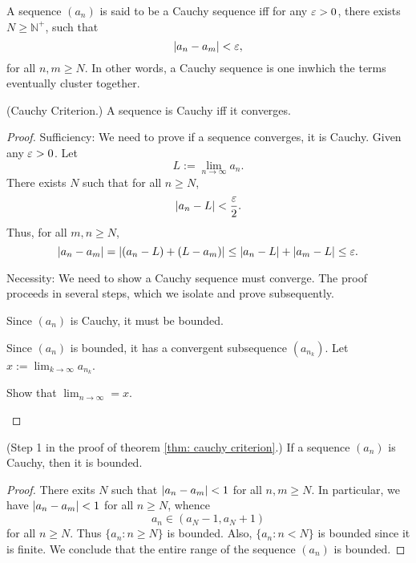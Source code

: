 \documentclass[10pt]{article}
\begin{document}
	\begin{definition}
		A sequence $(a_n)$ is said to be a Cauchy sequence iff for any $\varepsilon >0$, there exists $N \ge \mathbb{N}^+$, such that
		\begin{equation}
			\abs{a_n - a_m} < \varepsilon,
		\end{equation}
		for all $n,m \ge N$. In other words, a Cauchy sequence is one inwhich the terms eventually cluster together.
	\end{definition}
	\begin{theorem}\label{thm: cauchy criterion}
		(Cauchy Criterion.) A sequence is Cauchy iff it converges.
	\end{theorem}
	\begin{proof}
		Sufficiency: We need to prove if a sequence converges, it is Cauchy. Given any $\varepsilon > 0$. Let
		\begin{equation}
			L := \lim_{n \to \infty} a_n.
		\end{equation}
		There exists $N$ such that for all $n \ge N$,
		\begin{equation}
			\abs{a_n - L} < \frac{\varepsilon}{2}.
		\end{equation}
		Thus, for all $m,n \ge N$,
		\begin{equation}
			\abs{a_n - a_m} = \abs{(a_n - L) + (L - a_m)} \le \abs{a_n - L} + \abs{a_m - L} \le \varepsilon.
		\end{equation}

		Necessity: We need to show a Cauchy sequence must converge. The proof proceeds in several steps, which we isolate and prove subsequently.
		\begin{steps}
			\item Since $(a_n)$ is Cauchy, it must be bounded.
			\item Since $(a_n)$ is bounded, it has a convergent subsequence $(a_{n_k})$. Let $x:= \lim_{k \to \infty} a_{n_k}$.
			\item Show that $\lim_{n \to \infty} = x$.
		\end{steps}
	\end{proof}

	\begin{proposition}
		(Step 1 in the proof of theorem \ref{thm: cauchy criterion}.) If a sequence $(a_n)$ is Cauchy, then it is bounded.
	\end{proposition}
	\begin{proof}
		There exits $N$ such that $\abs{a_n - a_m} < 1$ for all $n,m \ge N$. In particular, we have $\abs{a_n - a_m} < 1$ for all $n \ge N$, whence
		\begin{equation}
			a_n \in (a_N - 1, a_N + 1)
		\end{equation}
		for all $n \ge N$. Thus $\{ a_n: n \ge N \}$ is bounded. Also, $\{ a_n: n < N \}$ is bounded since it is finite. We conclude that the entire range of the sequence $(a_n)$ is bounded.
	\end{proof}
\end{document}
